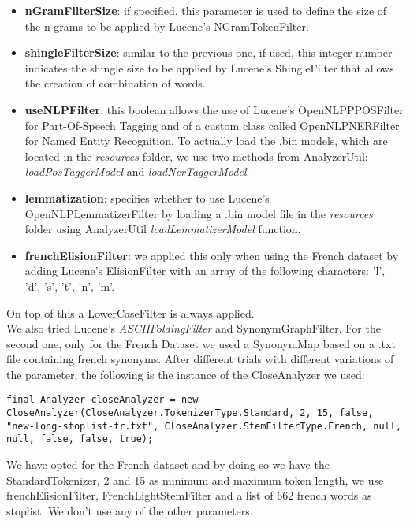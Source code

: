 \begin{itemize}
\begin{itemize}
  \item \textbf{nGramFilterSize}: if specified, this parameter is used to define the size of the n-grams to be applied by Lucene's NGramTokenFilter.
  \item \textbf{shingleFilterSize}: similar to the previous one, if used, this integer number indicates the shingle size to be applied by Lucene's ShingleFilter that allows the creation of combination of words.
  \item \textbf{useNLPFilter}: this boolean allows the use of Lucene's OpenNLPPPOSFilter for Part-Of-Speech Tagging and of a custom class called OpenNLPNERFilter for Named Entity Recognition. To actually load the .bin models, which are located in the \textit{resources} folder, we use two methods from AnalyzerUtil: \textit{loadPosTaggerModel} and \textit{loadNerTaggerModel}.
  \item \textbf{lemmatization}: specifies whether to use Lucene's OpenNLPLemmatizerFilter by loading a .bin model file in the \textit{resources} folder using AnalyzerUtil \textit{loadLemmatizerModel} function.
  \item \textbf{frenchElisionFilter}: we applied this only when using the French dataset by adding Lucene's ElisionFilter with an array of the following characters: 'l', 'd', 's', 't', 'n', 'm'.
\end{itemize}
On top of this a LowerCaseFilter is always applied. \\
We also tried Lucene's \textit{ASCIIFoldingFilter} and SynonymGraphFilter. For the second one, only for the French Dataset we used a SynonymMap based on a .txt file containing french synonyms.
\newline
After different trials with different variations of the parameter, the following is the instance of the CloseAnalyzer we used:

\begin{lstlisting}
final Analyzer closeAnalyzer = new CloseAnalyzer(CloseAnalyzer.TokenizerType.Standard, 2, 15, false, "new-long-stoplist-fr.txt", CloseAnalyzer.StemFilterType.French, null, null, false, false, true);
\end{lstlisting}
We have opted for the French dataset and by doing so we have the StandardTokenizer, 2 and 15 as minimum and maximum token length, we use frenchElisionFilter, FrenchLightStemFilter and a list of 662 french words as stoplist. We don't use any of the other parameters.



\end{itemize}
